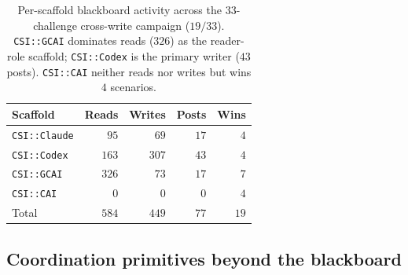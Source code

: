 \begin{table}[t]
\centering
\footnotesize
\setlength{\tabcolsep}{4pt}
\begin{tabular*}{\columnwidth}{@{\extracolsep{\fill}}lrrrr@{}}
\toprule
Scaffold        & Reads   & Writes & Posts & Wins \\
\midrule
\texttt{CSI::Claude}  & $95$   & $69$  & $17$ & $4$  \\
\texttt{CSI::Codex}   & $163$   & $307$   & $43$  & $4$  \\
\texttt{CSI::GCAI}    & $326$   & $73$   & $17$  & $7$  \\
\texttt{CSI::CAI}     & $0$ & $0$ & $0$ & $4$ \\
\midrule
Total           & $584$ & $449$ & $77$ & $19$ \\
\bottomrule
\end{tabular*}
\caption{Per-scaffold blackboard activity across the $33$-challenge cross-write campaign ($19/33$). \texttt{CSI::GCAI} dominates reads ($326$) as the reader-role scaffold; \texttt{CSI::Codex} is the primary writer ($43$ posts). \texttt{CSI::CAI} neither reads nor writes but wins $4$ scenarios.}\label{tab:bbactivity}
\end{table}

\iffalse
\subsection{Coordination primitives beyond the blackboard}\label{sec:primitives}

